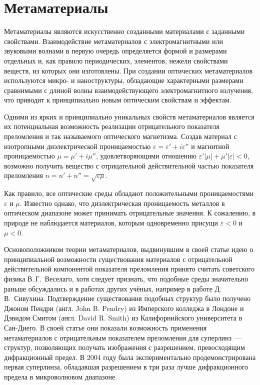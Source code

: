 \section{Метаматериалы}

Метаматериалы являются искусственно созданными материалами с заданными свойствами. Взаимодействие метаматериалов с электромагнитными или звуковыми \cite{Zhang2009} волнами в первую очередь определяется формой и размерами отдельных и, как правило периодических, элементов, нежели свойствами веществ, из которых они изготовлены. При создании оптических метаматериалов используются микро- и наноструктуры, обладающие характерными размерами сравнимыми с длиной волны взаимодействующего электромагнитного излучения, что приводит к принципиально новым оптическим свойствам и эффектам.

Одними из ярких и принципиально уникальных свойств метаматериалов является их потенциальная возможность реализации отрицательного показателя преломления и так называемого оптического магнетизма. Создав материал с изотропными диэлектрической проницаемостью $\varepsilon = \varepsilon' + i\varepsilon''$ и магнитной проницаемостью $\mu = \mu' + i\mu''$, удовлетворяющими отношению $\varepsilon'\left|\mu\right| + \mu'\left|\varepsilon\right| < 0$, возможно получить вещество с отрицательной действительной частью показателя преломления $n = n' + n'' = \sqrt{\varepsilon\mu}$. 

Как правило, все оптические среды обладают положительными проницаемостями $\varepsilon$ и $\mu$. Известно однако, что диэлектрическая проницаемость металлов в оптическом диапазоне может принимать отрицательные значения. К сожалению, в природе не наблюдается материалов, которым одновременно присущи $\varepsilon < 0$ и $\mu < 0$.

Основоположником теории метаматериалов, выдвинувшим в своей статье \cite{Veselago1967} идею о принципиальной возможности существования материалов с отрицательной действительной компонентой показателя преломления принято считать советского физика В.\,Г.~Веселаго, хотя следует признать, что подобные среды значительно раньше обсуждались и в работах других учёных, например в работе \cite{Sivoukhin1957} Д.\,В.~Сивухина. Подтверждение существования подобных структур было получено Джоном Пендри (англ. John B. Pendry) из Имперского колледжа в Лондоне и Дэвидом Смитом (англ. David R. Smith) из Калифорнийского университета в Сан-Диего. В своей статье \cite{Pendry2000} они показали возможность применения метаматериалов с отрицательным показателем преломления для суперлинз~--- структур, позволяющих получать изображения с разрешением, превосходящим дифракционный предел. В 2004 году была экспериментально продемонстрирована \cite{Grbic2004} первая суперлинза, обладавшая разрешением в три раза лучше дифракционного предела в микроволновом диапазоне.